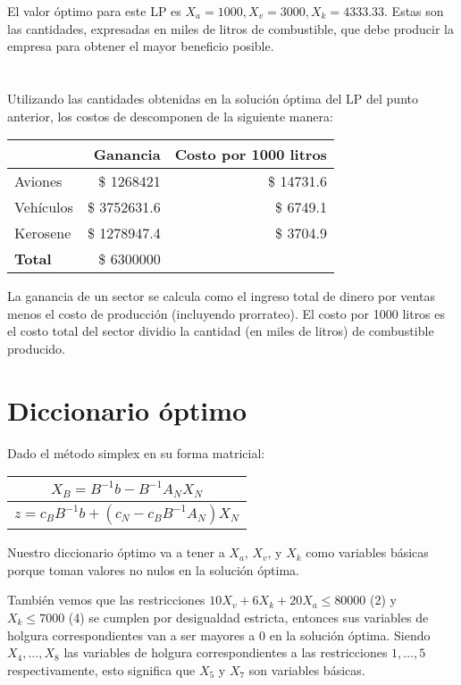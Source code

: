 \documentclass[10pt,a4paper]{article}
\begin{document}
El valor óptimo para este LP es $X_a = 1000, X_v = 3000,  X_k = 4333.33$. Estas son las cantidades, expresadas en miles de litros de combustible, que debe producir la empresa para obtener el mayor beneficio posible. 

\section{} %
Utilizando las cantidades obtenidas en la solución óptima del LP del punto anterior, los costos de descomponen de la siguiente manera:

\begin{table}[h!]
	\centering
	\begin{tabular}{|l|r|r|}
		\hline
		\textbf{} & \textbf{Ganancia} & \textbf{Costo por 1000 litros} \\
		\hline
		Aviones   & \$ 1268421 & \$ 14731.6 \\
		Vehículos & \$ 3752631.6 & \$ 6749.1 \\
		Kerosene  & \$ 1278947.4 & \$ 3704.9 \\
		\hline
		\textbf{Total} &\$ 6300000 & \\
		\hline
	\end{tabular}
\end{table}

La ganancia de un sector se calcula como el ingreso total de dinero por ventas menos el costo de producción (incluyendo prorrateo). El costo por 1000 litros es el costo total del sector dividio la cantidad (en miles de litros) de combustible producido. 

\section*{Diccionario óptimo}

Dado el método simplex en su forma matricial:
\begin{tabular}{c}
	$X_B = B^{-1}b - B^{-1}A_NX_N$ \\
	\hline
	$z = c_B B^{-1} b + (c_N - c_B B^{-1} A_N) X_N$
\end{tabular}

Nuestro diccionario óptimo va a tener a $X_a$, $X_v$, y $X_k$ como variables básicas porque toman valores no nulos en la solución óptima.

También vemos que las restricciones $10 X_v + 6 X_k + 20 X_a \leq 80000$ (2) y $X_k \leq 7000$ (4) se cumplen por desigualdad estricta, entonces sus variables de holgura correspondientes van a ser mayores a 0 en la solución óptima.
Siendo $X_4, \dots, X_8$ las variables de holgura correspondientes a las restricciones $1, \dots, 5$ respectivamente, esto significa que $X_5$ y $X_7$ son variables básicas.
\end{document}
